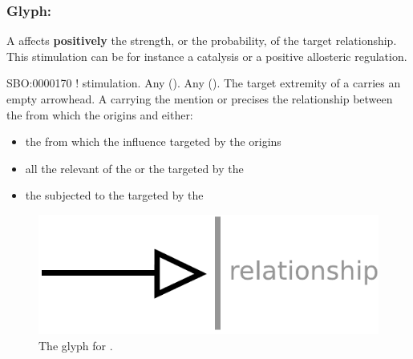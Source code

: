 
\subsubsection{Glyph: }\label{sec:stimulation}

A  affects \textbf{positively} the strength, or the probability, of the target relationship. This stimulation can be for instance a catalysis or a positive allosteric regulation.

\begin{glyphDescription}
 \glyphSboTerm SBO:0000170 ! stimulation.
 \glyphOrigin Any  ().
 \glyphTarget Any  ().
 \glyphEndPoint The target extremity of a  carries an empty arrowhead.
 \glyphAux A  carrying the mention  or  precises the relationship between the  from which the  origins and either:
\begin{itemize}
\item the  from which the influence targeted by the  origins
\item all the relevant  of the  or the  targeted by the 
\item the  subjected to the  targeted by the 
\end{itemize}
 \end{glyphDescription}

\begin{figure}[H]
  \centering
  \includegraphics[scale = 0.5]{images/stimulation}
  \caption{The \ER glyph for .}
  \label{fig:stimulation}
\end{figure}

